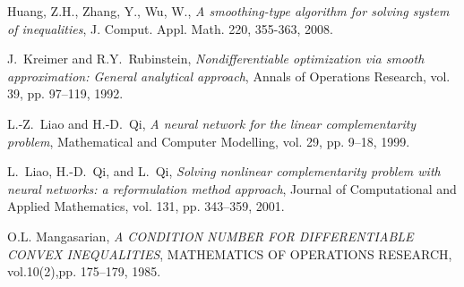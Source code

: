 \documentclass[12pt]{article}
\begin{document}
\begin{thebibliography}{1}
 {\sc Huang, Z.H., Zhang, Y., Wu, W.},
 {\em A smoothing-type algorithm for solving system of inequalities},
  J. Comput. Appl. Math. 220, 355-363, 2008.


%
%

 {\sc J.\ Kreimer and R.Y.\ Rubinstein},
 {\em Nondifferentiable optimization via smooth approximation: General analytical approach},
 Annals of Operations Research, vol. 39, pp. 97--119, 1992.

 {\sc L.-Z.\ Liao and H.-D.\ Qi},
 {\em A neural network for the linear complementarity problem},
 Mathematical and Computer Modelling, vol. 29, pp. 9--18, 1999.

 {\sc L.\ Liao, H.-D.\ Qi, and L.\ Qi},
 {\em Solving nonlinear complementarity problem with neural networks: a reformulation method approach},
 Journal of Computational and Applied Mathematics, vol. 131, pp. 343--359, 2001.


 {\sc O.L. Mangasarian},
  {\em A CONDITION NUMBER FOR DIFFERENTIABLE CONVEX INEQUALITIES},
   MATHEMATICS OF OPERATIONS RESEARCH, vol.10(2),pp. 175–179, 1985.



\end{thebibliography}
\end{document}
